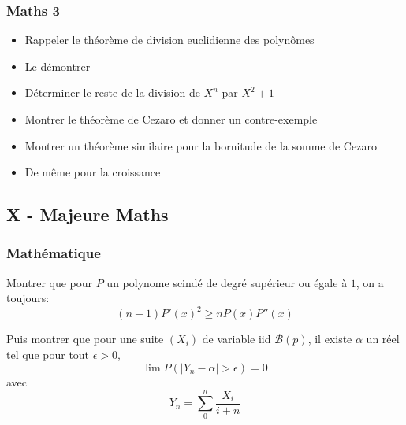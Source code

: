 \documentclass[11pt,a4paper]{article}
\begin{document}
\subsubsection{Maths 3}
\begin{itemize}
    \item Rappeler le théorème de division euclidienne des polynômes
    \item Le démontrer
    \item Déterminer le reste de la division de $X^n$ par $X^2 +1$
\end{itemize}

\begin{itemize}
    \item Montrer le théorème de Cezaro et donner un contre-exemple
    \item Montrer un théorème similaire pour la bornitude de la somme de Cezaro
    \item De même pour la croissance
\end{itemize}

\subsection{X - Majeure Maths}
\subsubsection{Mathématique}
Montrer que pour $P$ un polynome scindé de degré supérieur ou égale à $1$, on a toujours:
\[
(n-1)P'(x)^2 \geq nP(x)P''(x)
\]

Puis montrer que pour une suite $(X_i)$ de variable iid $\mathcal B(p)$, il existe $\alpha$ un réel tel que pour tout $\epsilon >0$, 
\[
\lim P(\mid Y_n-\alpha\mid > \epsilon) =0
\]
avec \[
Y_n = \sum_0^n \frac{X_i}{i+n}
\]
\end{document}
